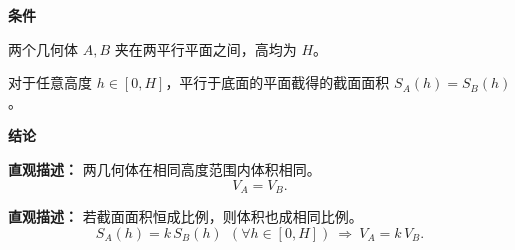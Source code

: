 \begin{statementbox}

	\textbf{\textcolor{CStatement}{条件}}
	\begin{description}[style=nextline, leftmargin=2.8em, labelsep=0.5em, itemsep=0.35em]
		\item[\textbf{\textcolor{CStatement}{条件1（夹持等高）：}}] 两个几何体 $A,B$ 夹在两平行平面之间，高均为 $H$。
		\item[\textbf{\textcolor{CStatement}{条件2（截面相等）：}}] 对于任意高度 $h\in[0,H]$，平行于底面的平面截得的截面面积 $S_A(h)=S_B(h)$。
	\end{description}

	\textbf{\textcolor{CStatement}{结论}}
	\begin{description}[style=nextline, leftmargin=2.8em, labelsep=0.5em, itemsep=0.45em]
		\item[\textbf{\textcolor{CStatement}{结论一（体积相等）：}}]
			\textbf{\textcolor{CStatement}{直观描述：}}
			两几何体在相同高度范围内体积相同。
			\[
				V_A = V_B.
			\]

		\item[\textbf{\textcolor{CStatement}{常见变形（截面成比例）：}}]
			\textbf{\textcolor{CStatement}{直观描述：}}
			若截面面积恒成比例，则体积也成相同比例。
			\[
				S_A(h) = k\,S_B(h)\ \ (\forall h\in[0,H])\ \Longrightarrow\ V_A = k\,V_B.
			\]
	\end{description}

\end{statementbox}
